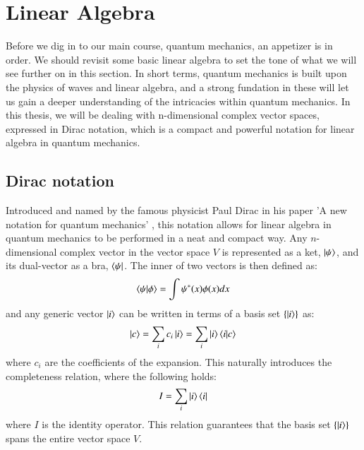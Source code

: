 \documentclass{subfiles}
\begin{document}
\section{Linear Algebra}
Before we dig in to our main course, quantum mechanics, an appetizer is in order. We should revisit some basic linear algebra to set the tone of what we will see further on in this section.
In short terms, quantum mechanics is built upon the physics of waves and linear algebra, and a strong fundation in these will let us gain a deeper understanding of the intricacies within quantum mechanics.
In this thesis, we will be dealing with n-dimensional complex vector spaces, expressed in Dirac notation, which is a compact and powerful notation for linear algebra in quantum mechanics.
\subsection*{Dirac notation}
Introduced and named by the famous physicist Paul Dirac in his paper 'A new notation for quantum mechanics' \cite{dirac_1939}, this notation allows for linear algebra in quantum mechanics to be performed in a neat and compact way. Any $n$-dimensional complex vector in the vector space $V$ is represented as a ket, $\ket{\psi}$, and its dual-vector as a bra, $\bra{\psi}$. The inner of two vectors is then defined as:
\begin{align*}
        \braket{\psi|\phi} = \int \psi^*(x)\phi(x) dx
\end{align*} 
and any generic vector $\ket{i}$ can be written in terms of a basis set $\{\ket{i}\}$ as:
\begin{align}
    \ket{c} = \sum_i c_i \ket{i} = \sum_i \ket{i}\braket{i|c} 
\end{align}
where $c_i$ are the coefficients of the expansion. This naturally introduces the completeness relation, where the following holds:
\begin{equation}
    I = \sum_i \ket{i}\bra{i}
\end{equation}
where $I$ is the identity operator. This relation guarantees that the basis set $\{\ket{i}\}$ spans the entire vector space $V$.

\end{document}
